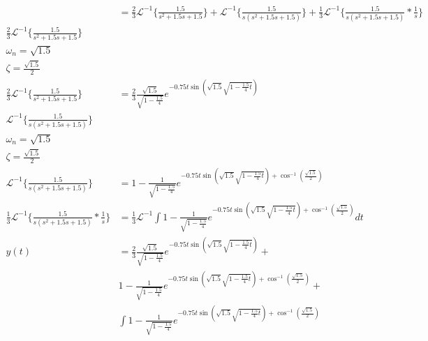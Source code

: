 \documentclass[12pt]{article}
\begin{document}
\begin{enumerate}[a.]
\begin{align*}
        &=\frac{2}{3} \mathcal{L}^{-1} \bigg\{\frac{1.5}{s^2 + 1.5s + 1.5}\bigg\} +\mathcal{L}^{-1} \bigg\{\frac{1.5}{s(s^2 + 1.5s + 1.5)} \bigg\} + \frac{1}{3}\mathcal{L}^{-1} \bigg\{\frac{1.5}{s(s^2 + 1.5s + 1.5)} * \frac{1}{s} \bigg\}\\
        \frac{2}{3} \mathcal{L}^{-1} \bigg\{\frac{1.5}{s^2 + 1.5s + 1.5}\bigg\} &\\
        \omega_n = \sqrt{1.5}&\\
        \zeta =  \frac{\sqrt{1.5}}{2}&\\
        \frac{2}{3} \mathcal{L}^{-1} \bigg\{\frac{1.5}{s^2 + 1.5s + 1.5}\bigg\} &= \frac{2}{3} \frac{\sqrt{1.5}}{\sqrt{1-\frac{1.5}{4}}}   e^{-0.75t\sin(\sqrt{1.5}\sqrt{1-\frac{1.5}{4}t})}\\
        \mathcal{L}^{-1} \bigg\{\frac{1.5}{s(s^2 + 1.5s + 1.5)} \bigg\}&\\
        \omega_n = \sqrt{1.5}&\\
        \zeta =  \frac{\sqrt{1.5}}{2}&\\
        \mathcal{L}^{-1} \bigg\{\frac{1.5}{s(s^2 + 1.5s + 1.5)}\bigg\} &= 1-\frac{1}{\sqrt{1-\frac{1.5}{4}}}   e^{-0.75t\sin(\sqrt{1.5}\sqrt{1-\frac{1.5}{4}t}) + \cos^{-1}(\frac{ \sqrt{1.5}}{2} )}\\
        \frac{1}{3}\mathcal{L}^{-1} \bigg\{\frac{1.5}{s(s^2 + 1.5s + 1.5)} * \frac{1}{s} \bigg\} &= \frac{1}{3}\mathcal{L}^{-1} \int 1-\frac{1}{\sqrt{1-\frac{1.5}{4}}}   e^{-0.75t\sin(\sqrt{1.5}\sqrt{1-\frac{1.5}{4}t}) + \cos^{-1}(\frac{ \sqrt{1.5}}{2} )} dt\\
        y(t) &= \frac{2}{3} \frac{\sqrt{1.5}}{\sqrt{1-\frac{1.5}{4}}}   e^{-0.75t\sin(\sqrt{1.5}\sqrt{1-\frac{1.5}{4}t})} +\\
            &1-\frac{1}{\sqrt{1-\frac{1.5}{4}}}   e^{-0.75t\sin(\sqrt{1.5}\sqrt{1-\frac{1.5}{4}t}) + \cos^{-1}(\frac{ \sqrt{1.5}}{2} )} + \\
            &\int 1-\frac{1}{\sqrt{1-\frac{1.5}{4}}}   e^{-0.75t\sin(\sqrt{1.5}\sqrt{1-\frac{1.5}{4}t}) + \cos^{-1}(\frac{ \sqrt{1.5}}{2} )}\\
    \end{align*}
\end{enumerate}
\end{document}
